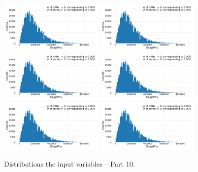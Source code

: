 \begin{figure}
  \subfloat{\qquad}
  \includegraphics[draft=false, width=0.45\textwidth, page=115, trim=15 0 15 0, clip]{figures/housing/overview_fig.pdf}\hfil
  \subfloat{\qquad}
  \includegraphics[draft=false, width=0.45\textwidth, page=116, trim=15 0 15 0, clip]{figures/housing/overview_fig.pdf}
  \subfloat{\qquad}
  \includegraphics[draft=false, width=0.45\textwidth, page=117, trim=15 0 15 0, clip]{figures/housing/overview_fig.pdf}\hfil
  \subfloat{\qquad}
  \includegraphics[draft=false, width=0.45\textwidth, page=118, trim=15 0 15 0, clip]{figures/housing/overview_fig.pdf}
  \subfloat{\qquad}
  \includegraphics[draft=false, width=0.45\textwidth, page=119, trim=15 0 15 0, clip]{figures/housing/overview_fig.pdf}\hfil
  \subfloat{\qquad}
  \includegraphics[draft=false, width=0.45\textwidth, page=120, trim=15 0 15 0, clip]{figures/housing/overview_fig.pdf}
  \caption[Distributions of the Input Variables -- Part 10]{Distributions the input variables -- Part 10.}
  \label{fig:h:variable_overview_all_10}
  \vspace{\abovecaptionskip}
\end{figure}

